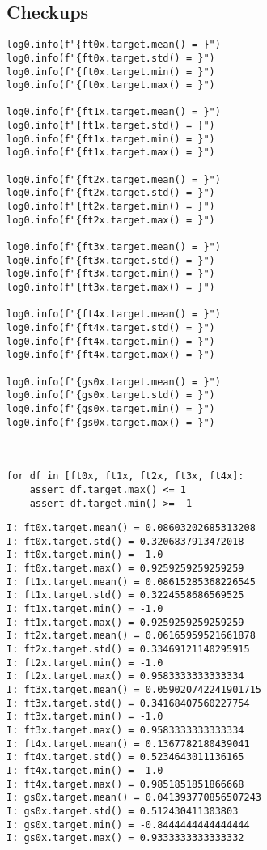 \documentclass[a4paper,10pt,onecolumn,oneside,openright]{article}
\begin{document}
\subsection{Checkups}
\label{sec:org76c6fb9}
\begin{verbatim}
log0.info(f"{ft0x.target.mean() = }")
log0.info(f"{ft0x.target.std() = }")
log0.info(f"{ft0x.target.min() = }")
log0.info(f"{ft0x.target.max() = }")

log0.info(f"{ft1x.target.mean() = }")
log0.info(f"{ft1x.target.std() = }")
log0.info(f"{ft1x.target.min() = }")
log0.info(f"{ft1x.target.max() = }")

log0.info(f"{ft2x.target.mean() = }")
log0.info(f"{ft2x.target.std() = }")
log0.info(f"{ft2x.target.min() = }")
log0.info(f"{ft2x.target.max() = }")

log0.info(f"{ft3x.target.mean() = }")
log0.info(f"{ft3x.target.std() = }")
log0.info(f"{ft3x.target.min() = }")
log0.info(f"{ft3x.target.max() = }")

log0.info(f"{ft4x.target.mean() = }")
log0.info(f"{ft4x.target.std() = }")
log0.info(f"{ft4x.target.min() = }")
log0.info(f"{ft4x.target.max() = }")

log0.info(f"{gs0x.target.mean() = }")
log0.info(f"{gs0x.target.std() = }")
log0.info(f"{gs0x.target.min() = }")
log0.info(f"{gs0x.target.max() = }")



for df in [ft0x, ft1x, ft2x, ft3x, ft4x]:
    assert df.target.max() <= 1
    assert df.target.min() >= -1

\end{verbatim}

\begin{verbatim}
I: ft0x.target.mean() = 0.08603202685313208
I: ft0x.target.std() = 0.3206837913472018
I: ft0x.target.min() = -1.0
I: ft0x.target.max() = 0.9259259259259259
I: ft1x.target.mean() = 0.08615285368226545
I: ft1x.target.std() = 0.3224558686569525
I: ft1x.target.min() = -1.0
I: ft1x.target.max() = 0.9259259259259259
I: ft2x.target.mean() = 0.06165959521661878
I: ft2x.target.std() = 0.33469121140295915
I: ft2x.target.min() = -1.0
I: ft2x.target.max() = 0.9583333333333334
I: ft3x.target.mean() = 0.059020742241901715
I: ft3x.target.std() = 0.34168407560227754
I: ft3x.target.min() = -1.0
I: ft3x.target.max() = 0.9583333333333334
I: ft4x.target.mean() = 0.1367782180439041
I: ft4x.target.std() = 0.5234643011136165
I: ft4x.target.min() = -1.0
I: ft4x.target.max() = 0.9851851851866668
I: gs0x.target.mean() = 0.041393770856507243
I: gs0x.target.std() = 0.512430411303803
I: gs0x.target.min() = -0.8444444444444444
I: gs0x.target.max() = 0.9333333333333332
\end{verbatim}
\end{document}
